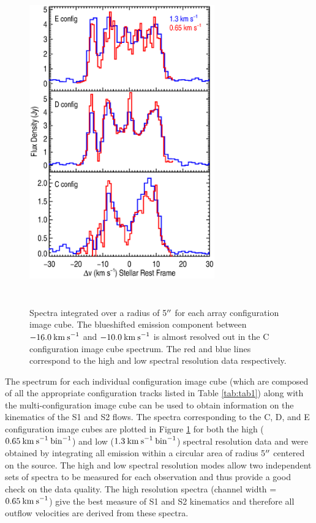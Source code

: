 \documentclass[iop]{emulateapj}
\begin{document}
\begin{figure}
\includegraphics[trim=90pt 60pt 45pt 50pt, clip, width=8.0cm, height=14.0cm]{f1.eps}
\caption{Spectra integrated over a radius of 5$\mbox{$^{\prime\prime}$}$ for each array configuration image cube. The blueshifted emission component between $-16.0\>{\rm km\>s}^{-1}$ and $-10.0\>{\rm km\>s}^{-1}$ is almost resolved out in the C configuration image cube spectrum. The red and blue lines correspond to the high and low spectral resolution data respectively.\label{fig1}}
\label{fig:fig1}
\end{figure}

The spectrum for each individual configuration image cube (which are composed of all the appropriate configuration tracks listed in Table \ref{tab:tab1}) along with the multi-configuration image cube can be used to obtain information on the kinematics of the S1 and S2 flows. The spectra corresponding  to the C, D, and E configuration image cubes are plotted in Figure \ref{fig:fig1} for both the high ($0.65\>{\rm km\>s}^{-1}\> \rm{bin}^{-1}$) and low ($1.3\>{\rm km\>s}^{-1}\> \rm{bin}^{-1}$) spectral resolution data and were obtained by integrating all emission within a circular area of radius 5$\mbox{$^{\prime\prime}$}$ centered on the source. The high and low spectral resolution modes allow two independent sets of spectra to be measured for each observation and thus provide a good check on the data quality. The high resolution  spectra (channel width = $0.65\>{\rm km\>s}^{-1}$) give the best measure of S1 and S2 kinematics and therefore all outflow velocities are derived from these spectra.
\end{document}
